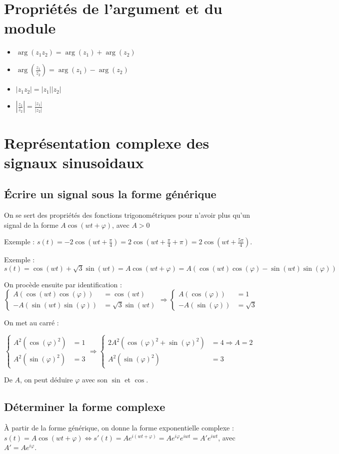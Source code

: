 \documentclass[french]{yLectureNote}
\begin{document}
\section{Propriétés de l'argument et du module}
\begin{itemize}
 \item $\arg(z_1z_2) = \arg(z_1)+\arg(z_2)$
 \item $\arg(\frac{z_1}{z_2}) = \arg(z_1)-\arg(z_2)$
 \item $|z_1z_2|=|z_1||z_2|$
 \item $|\frac{z_1}{z_2}| = \frac{|z_1|}{|z_2|}$
\end{itemize}
\section{Représentation complexe des signaux sinusoidaux}
\subsection{Écrire un signal sous la forme générique}
On se sert des propriétés des fonctions trigonométriques pour n'avoir plus qu'un signal de la forme $ A\cos(wt+\varphi)$, avec $A>0$

Exemple : $s(t) = -2\cos(wt+\frac{\pi}{4}) = 2\cos(wt+\frac{\pi}{4}+\pi) = 2\cos(wt+\frac{5\pi}{4})$.

Exemple : $s(t) = \cos(wt)+\sqrt{3}\sin(wt) = A\cos(wt+\varphi) = A(\cos(wt)\cos(\varphi)-\sin(wt)\sin(\varphi))$

On procède ensuite par identification :
\[\left\{\begin{matrix}
A(\cos(wt)\cos(\varphi))&= \cos(wt)\\
-A(\sin(wt)\sin(\varphi)) &= \sqrt{3}\sin(wt)
\end{matrix}\right.
\Rightarrow
\left\{\begin{matrix}
A(\cos(\varphi))&= 1\\
-A(\sin(\varphi)) &= \sqrt{3}
\end{matrix}\right.
\]

On met au carré :

\[\left\{\begin{matrix}
A^2(\cos(\varphi)^2)&= 1\\
A^2(\sin(\varphi)^2) &= 3
\end{matrix}\right.
\Rightarrow
\left\{\begin{matrix}
2A^2(\cos(\varphi)^2+\sin(\varphi)^2)&= 4 \Rightarrow A=2\\
A^2(\sin(\varphi)^2) &= 3
\end{matrix}\right.
\]

De $A$, on peut déduire $\varphi$ avec son $\sin$ et $\cos$.
\subsection{Déterminer la forme complexe}
À partir de la forme générique, on donne la forme exponentielle complexe : $s(t) = A\cos(wt+\varphi) \iff s'(t) = Ae^{i(wt+\varphi)} = Ae^{i\varphi}e^{iwt} = A'e^{iwt}$, avec $A' = Ae^{i\varphi}$.
\end{document}
